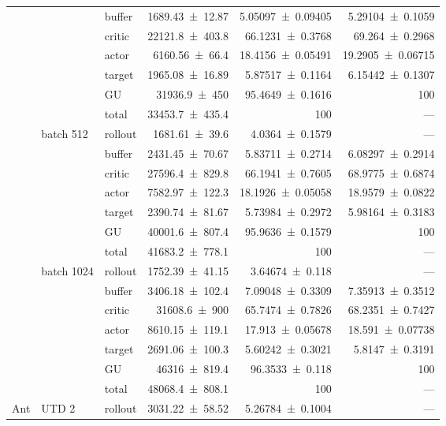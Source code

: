{\begin{longtable}{@{}lllrrr@{}}
     &  & buffer & \num{1689.43+-12.87} & \num{5.05097+-0.09405} & \num{5.29104+-0.1059} \\
     &  & critic & \num{22121.8+-403.8} & \num{66.1231+-0.3768} & \num{69.264+-0.2968} \\
     &  & actor & \num{6160.56+-66.4} & \num{18.4156+-0.05491} & \num{19.2905+-0.06715} \\
     &  & target & \num{1965.08+-16.89} & \num{5.87517+-0.1164} & \num{6.15442+-0.1307} \\
     &  & GU & \num{31936.9+-450} & \num{95.4649+-0.1616} & 100 \\
     &  & total & \num{33453.7+-435.4} & \num{100} & --- \\
    \addlinespace[2pt]
     & batch 512 & rollout & \num{1681.61+-39.6} & \num{4.0364+-0.1579} & --- \\
     &  & buffer & \num{2431.45+-70.67} & \num{5.83711+-0.2714} & \num{6.08297+-0.2914} \\
     &  & critic & \num{27596.4+-829.8} & \num{66.1941+-0.7605} & \num{68.9775+-0.6874} \\
     &  & actor & \num{7582.97+-122.3} & \num{18.1926+-0.05058} & \num{18.9579+-0.0822} \\
     &  & target & \num{2390.74+-81.67} & \num{5.73984+-0.2972} & \num{5.98164+-0.3183} \\
     &  & GU & \num{40001.6+-807.4} & \num{95.9636+-0.1579} & 100 \\
     &  & total & \num{41683.2+-778.1} & \num{100} & --- \\
    \addlinespace[2pt]
     & batch 1024 & rollout & \num{1752.39+-41.15} & \num{3.64674+-0.118} & --- \\
     &  & buffer & \num{3406.18+-102.4} & \num{7.09048+-0.3309} & \num{7.35913+-0.3512} \\
     &  & critic & \num{31608.6+-900} & \num{65.7474+-0.7826} & \num{68.2351+-0.7427} \\
     &  & actor & \num{8610.15+-119.1} & \num{17.913+-0.05678} & \num{18.591+-0.07738} \\
     &  & target & \num{2691.06+-100.3} & \num{5.60242+-0.3021} & \num{5.8147+-0.3191} \\
     &  & GU & \num{46316+-819.4} & \num{96.3533+-0.118} & 100 \\
     &  & total & \num{48068.4+-808.1} & \num{100} & --- \\
    \addlinespace[2pt]
    \midrule
    Ant & UTD 2 & rollout & \num{3031.22+-58.52} & \num{5.26784+-0.1004} & --- \\

\end{longtable}}
